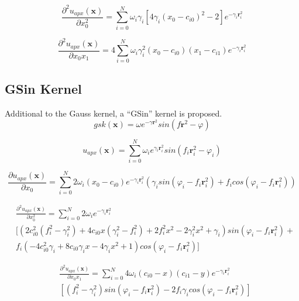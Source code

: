\documentclass[./\jobname.tex]{subfiles}
\begin{document}
\begin{equation}
\label{eq:uapx_gauss_kernel_x0x0}
\frac{\partial^2 u_{apx}(\mathbf{x})}{\partial x_0^2} = \sum_{i=0}^{N} \omega_i \gamma_i \left[ 4 \gamma_i (x_0 - c_{i0})^2 - 2 \right] e^{-\gamma_i \mathbf{r}_i^2}
\end{equation}

\begin{equation}
\label{eq:uapx_gauss_kernel_x0x1}
\frac{\partial^2 u_{apx}(\mathbf{x})}{\partial x_0 x_1} = 4 \sum_{i=0}^{N} \omega_i \gamma_i^2 (x_0 - c_{i0}) (x_1 - c_{i1}) e^{-\gamma_i \mathbf{r}_i^2} 
\end{equation}

\subsection{GSin Kernel}
\label{chap:gsin_kernel}
Additional to the Gauss kernel, a ``GSin'' kernel is proposed. 
\begin{equation}
\label{eq:gsin_kernel}
gsk(\mathbf{x}) = \omega e^{-\gamma \mathbf{r}^2} sin(f \mathbf{r}^2 - \varphi)
\end{equation}

\begin{equation}
\label{eq:uapx_gsin_kernel}
u_{apx}(\mathbf{x}) = \sum_{i=0}^{N} \omega_i e^{\gamma_i \mathbf{r}_i^2} sin(f_i \mathbf{r}_i^2 - \varphi_i)
\end{equation}

\begin{equation}
\label{eq:uapx_gsin_kernel_x0}
\frac{\partial u_{apx}(\mathbf{x})}{\partial x_0} = \sum_{i=0}^{N} 2 \omega_i (x_0 - c_{i0}) e^{-\gamma_i \mathbf{r}_i^2} (\gamma_i sin(\varphi_i - f_i \mathbf{r}_i^2) + f_i cos(\varphi_i - f_i \mathbf{r}_i^2))
\end{equation}

\begin{equation}
\label{eq:uapx_gsin_kernel_x0_x0}
\begin{split}
& \frac{\partial^2 u_{apx}(\mathbf{x})}{\partial x_0^2} = \sum_{i=0}^{N} 2 \omega_i e^{-\gamma_i \mathbf{r}_i^2} \\ & [ (2 c_{i0}^2 (f_i^2 - \gamma_i^2) + 4 c_{i0} x (\gamma_i^2 - f_i^2) + 2 f_i^2 x^2 - 2 \gamma_i^2 x^2 + \gamma_i) sin(\varphi_i - f_i \mathbf{r}_i^2) + \\ & f_i (-4 c_{i0}^2 \gamma_i + 8 c_{i0} \gamma_i x - 4 \gamma_i x^2 + 1) cos(\varphi_i - f_i \mathbf{r}_i^2) ]
\end{split}
\end{equation}

\begin{equation}
\label{eq:uapx_gsin_kernel_x0_x1}
\begin{split}
& \frac{\partial^2 u_{apx}(\mathbf{x})}{\partial x_0 x_1} = \sum_{i=0}^{N}  4 \omega_i (c_{i0} - x) (c_{i1} - y) e^{-\gamma_i \mathbf{r}_i^2} \\ & \left[(f_i^2 - \gamma_i^2) sin(\varphi_i - f_i \mathbf{r}_i^2) - 2 f_i \gamma_i cos(\varphi_i - f_i \mathbf{r}_i^2)\right]
\end{split}
\end{equation}
\end{document}
